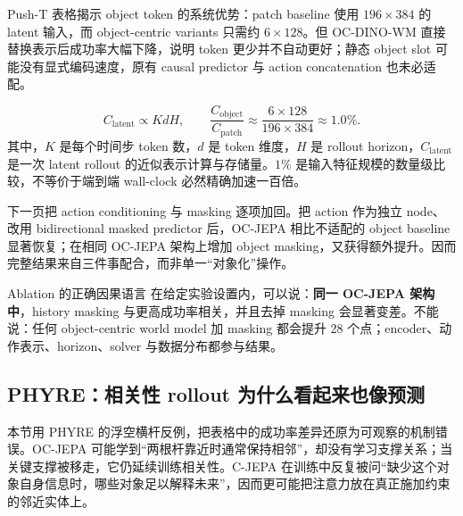 Push-T 表格揭示 object token 的系统优势：patch baseline 使用 $196\times384$ 的 latent 输入，而 object-centric variants 只需约 $6\times128$。但 OC-DINO-WM 直接替换表示后成功率大幅下降，说明 token 更少并不自动更好；静态 object slot 可能没有显式编码速度，原有 causal predictor 与 action concatenation 也未必适配。


\[
C_{\text{latent}}\propto KdH,
\qquad
\frac{C_{\text{object}}}{C_{\text{patch}}}
\approx\frac{6\times128}{196\times384}\approx1.0\%.
\]
其中，$K$ 是每个时间步 token 数，$d$ 是 token 维度，$H$ 是 rollout horizon，$C_{\text{latent}}$ 是一次 latent rollout 的近似表示计算与存储量。$1\%$ 是输入特征规模的数量级比较，不等价于端到端 wall-clock 必然精确加速一百倍。

下一页把 action conditioning 与 masking 逐项加回。把 action 作为独立 node、改用 bidirectional masked predictor 后，OC-JEPA 相比不适配的 object baseline 显著恢复；在相同 OC-JEPA 架构上增加 object masking，又获得额外提升。因而完整结果来自三件事配合，而非单一``对象化''操作。



\begin{importantbox}{Ablation 的正确因果语言}
在给定实验设置内，可以说：\textbf{同一 OC-JEPA 架构中}，history masking 与更高成功率相关，并且去掉 masking 会显著变差。不能说：任何 object-centric world model 加 masking 都会提升 28 个点；encoder、动作表示、horizon、solver 与数据分布都参与结果。
\end{importantbox}

\subsection{PHYRE：相关性 rollout 为什么看起来也像预测}

本节用 PHYRE 的浮空横杆反例，把表格中的成功率差异还原为可观察的机制错误。OC-JEPA 可能学到``两根杆靠近时通常保持相邻''，却没有学习支撑关系；当关键支撑被移走，它仍延续训练相关性。C-JEPA 在训练中反复被问``缺少这个对象自身信息时，哪些对象足以解释未来''，因而更可能把注意力放在真正施加约束的邻近实体上。

